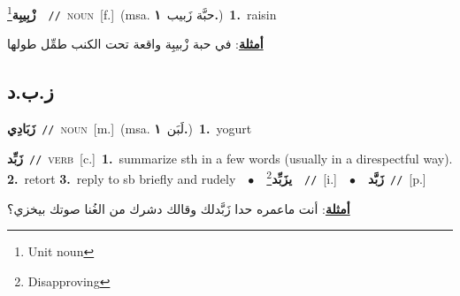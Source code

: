 \documentclass[10pt,a4paper,twoside]{article} %
\begin{document}
\begin{multicols}{2}
{{{\setlength\topsep{0pt}\textbf{\foreignlanguage{arabic}{زْبِيبِة}}\footnote{Unit noun}\ \ {\color{gray}\texttt{//}\color{black}}\ \textsc{noun}\ [f.]\ \color{gray}(msa. \foreignlanguage{arabic}{حبَّة زَبيب}~\foreignlanguage{arabic}{\textbf{١.}})\color{black}\ \textbf{1.}~raisin\  \begin{flushright}\color{gray}\foreignlanguage{arabic}{\textbf{\underline{\foreignlanguage{arabic}{أمثلة}}}: في حبة زْبيبِة واقعة تحت الكنب طمِّل طولها}\end{flushright}\color{black}} \vspace{2mm}

\vspace{-3mm}
\subsection*{\color{blue}\foreignlanguage{arabic}{ز.ب.د}\color{blue}{}} 

{\setlength\topsep{0pt}\textbf{\foreignlanguage{arabic}{زَبَادِي}}\ {\color{gray}\texttt{//}\color{black}}\ \textsc{noun}\ [m.]\ \color{gray}(msa. \foreignlanguage{arabic}{لَبَن}~\foreignlanguage{arabic}{\textbf{١.}})\color{black}\ \textbf{1.}~yogurt\ 

{\setlength\topsep{0pt}\textbf{\foreignlanguage{arabic}{زَبِّد}}\ {\color{gray}\texttt{//}\color{black}}\ \textsc{verb}\ [c.]\ \textbf{1.}~summarize sth in a few words (usually in a direspectful way).  \textbf{2.}~retort  \textbf{3.}~reply to sb briefly and rudely\ \ $\bullet$\ \ \setlength\topsep{0pt}\textbf{\foreignlanguage{arabic}{يزَبِّد}}\footnote{Disapproving}\ \ {\color{gray}\texttt{//}\color{black}}\ [i.]\ \ $\bullet$\ \ \setlength\topsep{0pt}\textbf{\foreignlanguage{arabic}{زَبَّد}}\ {\color{gray}\texttt{//}\color{black}}\ [p.]\  \begin{flushright}\color{gray}\foreignlanguage{arabic}{\textbf{\underline{\foreignlanguage{arabic}{أمثلة}}}: أنت ماعمره حدا زَبَّدلك وقالك دشرك من الغُنا صوتك بيخزي؟}\end{flushright}\color{black}} \vspace{2mm}

}}}
\end{multicols}
\end{document}
